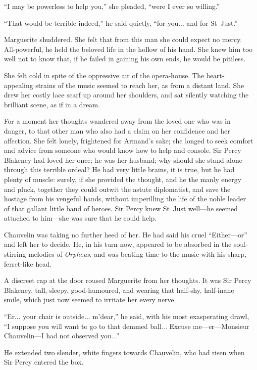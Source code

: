 \enquote{I may be powerless to help you,} she pleaded, \enquote{were I ever so willing.}

\enquote{That would be terrible indeed,} he said quietly, \enquote{for you... and for St~Just.}

Marguerite shuddered. She felt that from this man she could expect no mercy. All-powerful, he held the beloved life in the hollow of his hand. She knew him too well not to know that, if he failed in gaining his own ends, he would be pitiless.

She felt cold in spite of the oppressive air of the opera-house. The heart-appealing strains of the music seemed to reach her, as from a distant land. She drew her costly lace scarf up around her shoulders, and sat silently watching the brilliant scene, as if in a dream.

For a moment her thoughts wandered away from the loved one who was in danger, to that other man who also had a claim on her confidence and her affection. She felt lonely, frightened for Armand's sake; she longed to seek comfort and advice from someone who would know how to help and console. Sir Percy Blakeney had loved her once; he was her husband; why should she stand alone through this terrible ordeal? He had very little brains, it is true, but he had plenty of muscle: surely, if she provided the thought, and he the manly energy and pluck, together they could outwit the astute diplomatist, and save the hostage from his vengeful hands, without imperilling the life of the noble leader of that gallant little band of heroes. Sir Percy knew St~Just well---he seemed attached to him---she was sure that he could help.

Chauvelin was taking no further heed of her. He had said his cruel \enquote{Either---or\longdash} and left her to decide. He, in his turn now, appeared to be absorbed in the soul-stirring melodies of \textit{Orpheus}, and was beating time to the music with his sharp, ferret-like head.

A discreet rap at the door roused Marguerite from her thoughts. It was Sir Percy Blakeney, tall, sleepy, good-humoured, and wearing that half-shy, half-inane smile, which just now seemed to irritate her every nerve.

\enquote{Er... your chair is outside... m'dear,} he said, with his most exasperating drawl, \enquote{I suppose you will want to go to that demmed ball... Excuse me---er---Monsieur Chauvelin---I had not observed you...}

He extended two slender, white fingers towards Chauvelin, who had risen when Sir Percy entered the box.

